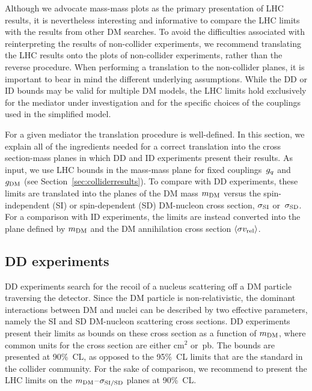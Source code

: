 

Although we advocate mass-mass plots as the primary 
presentation of  LHC results, it is nevertheless interesting and informative to compare  the LHC limits with the results from other DM searches. To avoid the difficulties associated with reinterpreting the results of non-collider experiments, we recommend translating the LHC results onto the plots of non-collider experiments, rather than the reverse procedure. When performing a translation to the non-collider planes, it is important to bear in mind the different underlying assumptions.  While the DD or ID bounds may be valid for multiple DM models, the LHC limits hold exclusively for the mediator under investigation and for the specific choices of the couplings used in the simplified model.

For a given mediator the translation procedure is well-defined. In this section, we explain all of the ingredients needed for a correct translation into the cross section-mass planes in which  DD and ID experiments present their results. As input, we use  LHC bounds in the mass-mass plane for fixed couplings~$g_q$ and~$g_{\rm{DM}}$ (see Section~\ref{sec:colliderresults}). To compare with  DD experiments, these limits are translated into the  planes of the DM mass $m_{\rm{DM}}$ versus the spin-independent (SI) or spin-dependent (SD)  DM-nucleon cross section, $\sigma_{\rm SI}$ or~$\sigma_{\rm SD}$. For a comparison with ID experiments, the limits are instead converted into the plane defined by $m_{\rm{DM}}$ and the DM annihilation cross section $\langle \sigma v_{\rm{rel}} \rangle$.

\subsection{ DD experiments}

DD experiments search for the recoil of a nucleus scattering off a DM particle traversing the detector. Since the DM particle is non-relativistic, the dominant interactions between DM and nuclei can be described by two effective parameters, namely the SI and SD DM-nucleon scattering cross sections. DD experiments present their limits as bounds on these  cross section as a function of $m_{\rm{DM}}$, where common units for the  cross section are either $\text{cm}^2$ or~pb. The  bounds are presented at 90\%~CL, as opposed to the 95\%~CL limits that are the standard in the collider community. For the sake of comparison, we recommend to present the  LHC limits on the  $m_{\rm{DM}}$--$\hspace{0.25mm} \sigma_{\rm{SI/SD}}$ planes at 90\%~CL.

